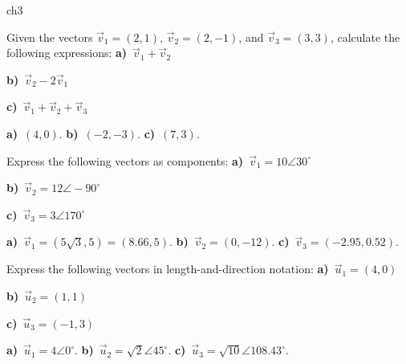
\begin{exercises}{ch3}

	\begin{exercise}
		Given the vectors $\vec{v}_1=(2,1)$, $\vec{v}_2=(2,-1)$, and $\vec{v}_3=(3,3)$,
		calculate the following expressions:
		\threecol
			\textbf{a)}~$\vec{v}_1 + \vec{v}_2$
			
			\textbf{b)}~$\vec{v}_2 - 2\vec{v}_1$
			
			\textbf{c)}~$\vec{v}_1 + \vec{v}_2 + \vec{v}_3$
		\endthreecol
		
		\begin{eanswer}\textbf{a)}~$(4,0)$.
					\textbf{b)}~$(-2,-3)$.
					\textbf{c)}~$(7,3)$.\end{eanswer}
	\end{exercise}

	\begin{exercise}	\label{exercise:vector-polar-to-cartesian-conversion}
		Express the following vectors as components:
		\threecol
			\textbf{a)}~$\vec{v}_1 =10\angle30^\circ$
			
			\textbf{b)}~$\vec{v}_2 = 12\angle\!-\!90^\circ$
			
			\textbf{c)}~$\vec{v}_3 = 3\angle170^\circ$
		\endthreecol

		\begin{eanswer}\textbf{a)}~$\vec{v}_1=(5\sqrt{3},5)=(8.66,5)$.
					\textbf{b)}~$\vec{v}_2=(0,-12)$.
					\textbf{c)}~$\vec{v}_3=(-2.95,0.52)$.\end{eanswer}
	\end{exercise}


	\begin{exercise}	\label{exercise:vector-cartesian-to-polar-conversion}
		Express the following vectors in length-and-direction notation:
		\threecol
			\textbf{a)}~$\vec{u}_1 = (4,0)$
			
			\textbf{b)}~$\vec{u}_2 = (1,1)$
			
			\textbf{c)}~$\vec{u}_3 = (-1,3)$
		\endthreecol

		\begin{eanswer}\textbf{a)}~$\vec{u}_1=4\angle 0^\circ$. 
					\textbf{b)}~$\vec{u}_2=\sqrt{2}\angle 45^\circ$.
					\textbf{c)}~$\vec{u}_3=\sqrt{10}\angle108.43^\circ$.\end{eanswer}
	\end{exercise}



%			
%			




\end{exercises}
